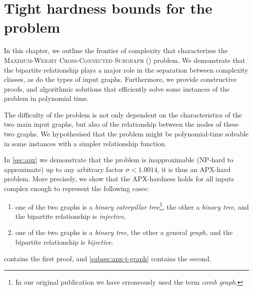 \chapter[Tight hardness bounds for the \mwccs{} problem][\mwccs{}]{Tight hardness bounds for the \mwccs{} problem}
\label{chap:hard}

	In this chapter, we outline the frontier of complexity that characterizes the \textsc{Maximum-Weight Cross-Connected Subgraph} (\mwccs{}) problem.
	We demonstrate that the bipartite relationship plays a major role in the separation between complexity classes, as do the types of input graphs.
	Furthermore, we provide constructive proofs, and algorithmic solutions that efficiently solve some instances of the problem in polynomial time.

	The difficulty of the problem is not only dependent on the characteristics of the two main input graphs, but also of the relationship between the nodes of these two graphs.
	We hypothesised that the problem might be polynomial-time solvable in some instances with a simpler relationship function.

In \cref{sec:apx} we demonstrate that the \mwccs{} problem is inapproximable (NP-hard to approximate) up to any arbitrary factor $\sigma < 1.0014$, it is thus an APX-hard problem.
	More precisely, we show that the APX-hardness holds for all inputs complex enough to represent the following cases:
	\begin{enumerate}
		\item one of the two graphs is a \emph{binary caterpillar tree}\footnote{In our original publication \parencite{hume2015approximation} we have erroneously used the term \emph{comb graph}.}, the other a \emph{binary tree}, and the bipartite relationship is \emph{injective},
		\item one of the two graphs is a \emph{binary tree}, the other a general \emph{graph}, and the bipartite relationship is \emph{bijective}.
	\end{enumerate}
	 contains the first proof, and \cref{subsec:apx-t-graph} contains the second.

